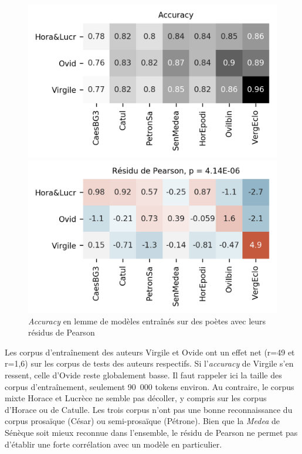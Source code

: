 \begin{figure}[ht]
    \hspace*{-0.05\linewidth}
    \begin{minipage}[c]{0.55\linewidth}
        \includegraphics[width=1\linewidth]{figures/chap3/longreeVariante/LongreeVariante-AccuracyStyleDePoesie-Lemme.png}
    \end{minipage} \hfill
    \begin{minipage}[c]{0.55\linewidth}
        \includegraphics[width=1\linewidth]{figures/chap3/longreeVariante/LongreeVariante-AssocPlotStyleDePoesie-Lemme.png}
    \end{minipage}
    \caption{\textit{Accuracy} en lemme de modèles entraînés sur des poètes avec leurs résidus de Pearson}
    \label{fig:lemmatisation:longree:poetes}
\end{figure}

Les corpus d'entraînement des auteurs Virgile et Ovide ont un effet net (r=49 et r=1,6) sur les corpus de tests des auteurs respectifs. Si l'\textit{accuracy} de Virgile s'en ressent, celle d'Ovide reste globalement basse. Il faut rappeler ici la taille des corpus d'entraînement, seulement 90~000 tokens environ. Au contraire, le corpus mixte Horace et Lucrèce ne semble pas décoller, y compris sur les corpus d'Horace ou de Catulle. Les trois corpus n'ont pas une bonne reconnaissance du corpus prosaïque (César) ou semi-prosaïque (Pétrone). Bien que la \textit{Medea} de Sénèque soit mieux reconnue dans l'ensemble, le résidu de Pearson ne permet pas d'établir une forte corrélation avec un modèle en particulier.

